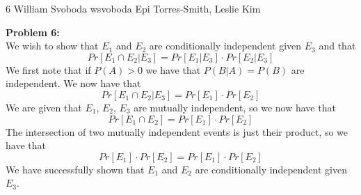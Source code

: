 \documentclass[12pt,letterpaper]{cos340hw}
\begin{document}
           {6}            %
           {William Svoboda}  %
           {wsvoboda}   %
           {Epi Torres-Smith, Leslie Kim} 




\noindent\textbf{Problem 6:}\\
We wish to show that $E_1$ and $E_2$ are conditionally independent given $E_3$ and that
$$Pr[E_1\cap E_2|E_3]=Pr[E_1|E_3]\cdot Pr[E_2|E_3]$$
We first note that 
if $P(A)>0$ we have that $P(B|A)=P(B)$ are independent. We now have that
$$Pr[E_1\cap E_2|E_3]=Pr[E_1]\cdot Pr[E_2]$$
We are given that $E_1$, $E_2$, $E_3$ are mutually independent, so we now have that
$$Pr[E_1\cap E_2]=Pr[E_1]\cdot Pr[E_2]$$
The intersection of two mutually independent events is just their product, so we have that
$$Pr[E_1]\cdot Pr[E_2]=Pr[E_1]\cdot Pr[E_2]$$
We have successfully shown that $E_1$ and $E_2$ are conditionally independent given $E_3$.

\end{document}
